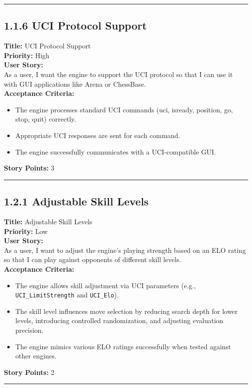 \documentclass[12pt]{article}
\begin{document}
\bigskip
\hrule
\bigskip

\subsection{1.1.6 UCI Protocol Support}
\textbf{Title:} UCI Protocol Support\\
\textbf{Priority:} High\\
\textbf{User Story:}\\
As a user, I want the engine to support the UCI protocol so that I can use it with GUI applications like Arena or ChessBase.\\
\textbf{Acceptance Criteria:}
\begin{itemize}
    \item The engine processes standard UCI commands (uci, isready, position, go, stop, quit) correctly.
    \item Appropriate UCI responses are sent for each command.
    \item The engine successfully communicates with a UCI-compatible GUI.
\end{itemize}
\textbf{Story Points:} 3

\bigskip
\hrule
\bigskip

\newpage
\subsection{1.2.1 Adjustable Skill Levels}
\textbf{Title:} Adjustable Skill Levels\\
\textbf{Priority:} Low\\
\textbf{User Story:}\\
As a user, I want to adjust the engine’s playing strength based on an ELO rating so that I can play against opponents of different skill levels.\\
\textbf{Acceptance Criteria:}
\begin{itemize}
    \item The engine allows skill adjustment via UCI parameters (e.g., \texttt{UCI\_LimitStrength} and \texttt{UCI\_Elo}).
    \item The skill level influences move selection by reducing search depth for lower levels, introducing controlled randomization, and adjusting evaluation precision.
    \item The engine mimics various ELO ratings successfully when tested against other engines.
\end{itemize}
\textbf{Story Points:} 2

\bigskip
\hrule
\bigskip
\end{document}
